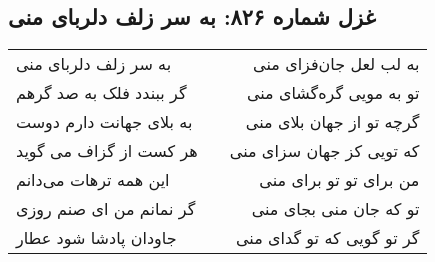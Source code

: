 \begin{center}
\section*{غزل شماره ۸۲۶: به سر زلف دلربای منی}
\label{sec:826}
\begin{longtable}{l p{0.5cm} r}
به سر زلف دلربای منی
&&
به لب لعل جان‌فزای منی
\\
گر ببندد فلک به صد گرهم
&&
تو به مویی گره‌گشای منی
\\
به بلای جهانت دارم دوست
&&
گرچه تو از جهان بلای منی
\\
هر کست از گزاف می گوید
&&
که تویی کز جهان سزای منی
\\
این همه ترهات می‌دانم
&&
من برای تو تو برای منی
\\
گر نمانم من ای صنم روزی
&&
تو که جان منی بجای منی
\\
جاودان پادشا شود عطار
&&
گر تو گویی که تو گدای منی
\\
\end{longtable}
\end{center}
